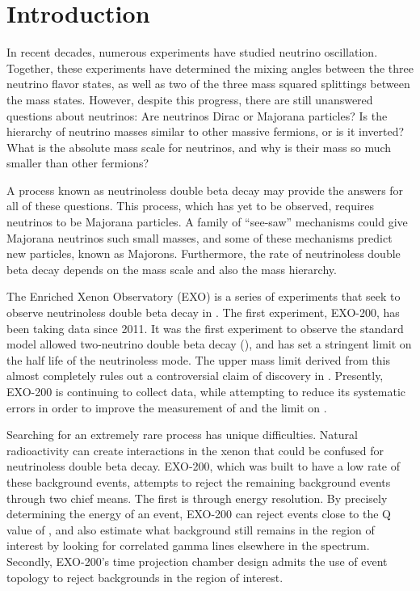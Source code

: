 \documentclass[herrin-thesis.tex]{subfiles}
\begin{document}
\chapter{Introduction}

In recent decades, numerous experiments have studied neutrino oscillation. Together, these experiments have determined the mixing angles between the three neutrino flavor states, as well as two of the three mass squared splittings between the mass states. However, despite this progress, there are still unanswered questions about neutrinos: Are neutrinos Dirac or Majorana particles? Is the hierarchy of neutrino masses similar to other massive fermions, or is it inverted? What is the absolute mass scale for neutrinos, and why is their mass so much smaller than other fermions?

A process known as neutrinoless double beta decay may provide the answers for all of these questions. This process, which has yet to be observed, requires neutrinos to be Majorana particles. A family of ``see-saw'' mechanisms could give Majorana neutrinos such small masses, and some of these mechanisms predict new particles, known as Majorons. Furthermore, the rate of neutrinoless double beta decay depends on the mass scale and also the mass hierarchy. 

The Enriched Xenon Observatory (EXO) is a series of experiments that seek to observe neutrinoless double beta decay in . The first experiment, EXO-200, has been taking data since 2011. It was the first experiment to observe the standard model allowed two-neutrino double beta decay (\twonu)\cite{Ackerman:2011gz}, and has set a stringent limit on the half life of the neutrinoless mode\cite{Auger:2012ar}. The upper mass limit derived from this almost completely rules out a controversial claim of discovery in \cite{KlapdorKleingrothaus:2006ff}. Presently, EXO-200 is continuing to collect data, while attempting to reduce its systematic errors in order to improve the measurement of \twonu{} and the limit on \zeronu{}.

Searching for an extremely rare process has unique difficulties. Natural radioactivity can create interactions in the xenon that could be confused for neutrinoless double beta decay. EXO-200, which was built to have a low rate of these background events, attempts to reject the remaining background events through two chief means. The first is through energy resolution. By precisely determining the energy of an event, EXO-200 can reject events close to the Q value of , and also estimate what background still remains in the region of interest by looking for correlated gamma lines elsewhere in the spectrum. Secondly, EXO-200's time projection chamber design admits the use of event topology to reject backgrounds in the region of interest.
\end{document}
